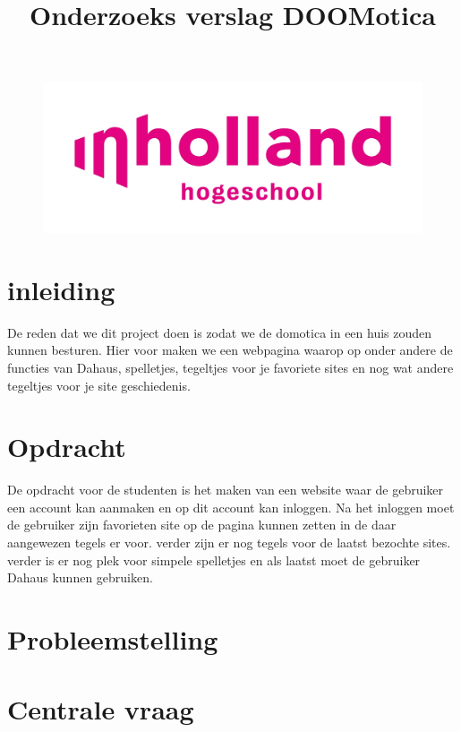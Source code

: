 \documentclass[11pt]{article}
\title{Onderzoeks verslag DOOMotica}
\begin{document}
	\maketitle %
	\begin{figure}[h]
		\centering
		\includegraphics[width=\textwidth]{inholland}
	\end{figure}
	
	\newpage
	
	\tableofcontents
	\newpage
	\section{inleiding}
	De reden dat we dit project doen is zodat we de domotica in een huis zouden kunnen besturen. Hier voor maken we een webpagina waarop op onder andere de functies van Dahaus, spelletjes, tegeltjes voor je favoriete sites en nog wat andere tegeltjes voor je site geschiedenis.
	\newpage
	
	\section{Opdracht}
	De opdracht voor de studenten is het maken van een website waar de gebruiker een account kan aanmaken en op dit account kan inloggen. Na het inloggen moet de gebruiker zijn favorieten site op de pagina kunnen zetten in de daar aangewezen tegels er voor. verder zijn er nog tegels voor de laatst bezochte sites. verder is er nog plek voor simpele spelletjes en als laatst moet de gebruiker Dahaus kunnen gebruiken.
	\newpage
	
	\section{Probleemstelling}
	
	\newpage
	
	\section{Centrale vraag}
	
\end{document}
